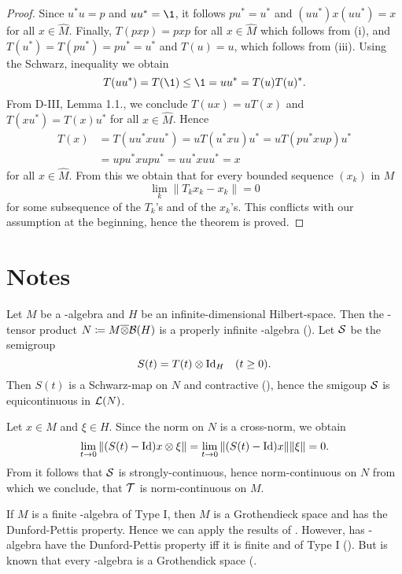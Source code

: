 \begin{proof}
Since $u^{*}u = p$ and $uu^{*} = \1$, it follows $pu^{*} = u^{*}$ and $(uu^{*})x(uu^{*}) = x$ for all $x \in \widehat{M}$.
Finally, $T(pxp) = pxp$ for all $x \in \widehat{M}$ which follows from (i), and $T(u^{*}) = T(pu^{*}) = pu^{*} = u^{*}$ and $T(u) = u$, which follows from (iii).
Using the Schwarz, inequality we obtain
\[
	T(uu^{*}) = T(\1) \leq \1 = uu^{*} = T(u)T(u)^{*}.
\]
From D-III, Lemma 1.1., we conclude $T(ux) = uT(x)$ and $T(xu^{*}) = T(x)u^{*}$ for all $x \in \widehat{M}$.
Hence
\begin{align*}
T(x) &= T(uu^{*}xuu^{*}) = uT(u^{*}xu)u^{*} = uT(pu^{*}xup)u^{*} \\
&= upu^{*}xupu^{*} = uu^{*}xuu^{*} = x
\end{align*}
for all $x \in \widehat{M}$.
From this we obtain that for every bounded sequence $(x_{k})$ in $M$
\[
	\lim_k \|T_k x_{k} - x_{k}\| = 0
\]
for some subsequence of the $T_{k}$'s and of the $x_{k}$'s.
This conflicts with our assumption at the beginning, hence the theorem is proved.
\end{proof}

\section*{Notes}
Let $ M $ be a \WA-algebra and $ H $ be an infinite-dimensional Hilbert-space. 
Then the \WA-tensor product $ N \coloneq M \overline{\otimes} \mathcal{B}(H) $ is a properly infinite \WA-algebra (\citet[Thm. 2.6.6]{sakai:1971}).
Let $ \mathcal{S} $ be the semigroup 
%
\[
	S(t) = T(t) \otimes \operatorname{Id}_{H} \quad (t \geq 0). 
\]
%
Then $ S(t) $ is a Schwarz-map on $ N $ and contractive (\citet[Prop. IV.5.13.]{takesaki:1979}), hence the smigoup $ \mathcal{S} $ is equicontinuous in $ \mathcal{L}(N) $.

Let $ x \in M $ and $  \xi \in H$.
Since the norm on $ N $ is a cross-norm, we obtain
%
\[
	\lim_{t \to 0} \| ( S(t) - \operatorname{Id} ) x \otimes \xi \| =
	\lim_{t \to 0} \| ( S(t) - \operatorname{Id} ) x \| \| \xi \| = 0.
\]
%
From \citet[III.4.5]{schaefer:1966} it follows that $ \mathcal{S} $ is strongly-continuous, hence norm-continuous on $ N $ from which we conclude, that $ \mathcal{T} $ is norm-continuous on $ M $.
\begin{remark}
If $ M $ is a finite \WA-algebra of Type I, then $ M $ is a Grothendieck space and has the Dunford-Pettis property. 
Hence we can apply the results of \citet{lotz:1985}.
However, has \WA-algebra have the Dunford-Pettis property iff it is finite and of Type I (\citet{chu:1990}).
But is known that every \WA-algebra is a Grothendick space (\citet{pfitzner:1994}.
\end{remark}



\RaggedRight

 






